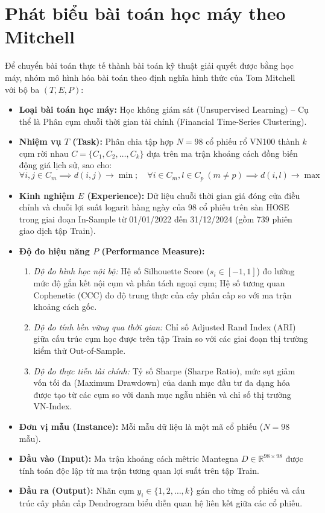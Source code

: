 \documentclass[12pt,a4paper,oneside,openany]{report}
\begin{document}
\section{Phát biểu bài toán học máy theo Mitchell}
Để chuyển bài toán thực tế thành bài toán kỹ thuật giải quyết được bằng học máy, nhóm mô hình hóa bài toán theo định nghĩa hình thức của Tom Mitchell \cite{mitchell1997} với bộ ba $(T, E, P)$:
\begin{itemize}
  \item \textbf{Loại bài toán học máy:} Học không giám sát (Unsupervised Learning) -- Cụ thể là Phân cụm chuỗi thời gian tài chính (Financial Time-Series Clustering).
  \item \textbf{Nhiệm vụ $T$ (Task):} Phân chia tập hợp $N = 98$ cổ phiếu rổ VN100 thành $k$ cụm rời nhau $C = \{C_1, C_2, \dots, C_k\}$ dựa trên ma trận khoảng cách đồng biến động giá lịch sử, sao cho:
  \begin{equation}
    \forall i, j \in C_m \implies d(i, j) \to \min; \quad \forall i \in C_m, l \in C_p \ (m \ne p) \implies d(i, l) \to \max
  \end{equation}
  \item \textbf{Kinh nghiệm $E$ (Experience):} Dữ liệu chuỗi thời gian giá đóng cửa điều chỉnh và chuỗi lợi suất logarit hàng ngày của 98 cổ phiếu trên sàn HOSE trong giai đoạn In-Sample từ 01/01/2022 đến 31/12/2024 (gồm 739 phiên giao dịch tập Train).
  \item \textbf{Độ đo hiệu năng $P$ (Performance Measure):}
  \begin{enumerate}
    \item \textit{Độ đo hình học nội bộ:} Hệ số Silhouette Score ($s_i \in [-1, 1]$) đo lường mức độ gắn kết nội cụm và phân tách ngoại cụm; Hệ số tương quan Cophenetic (CCC) đo độ trung thực của cây phân cấp so với ma trận khoảng cách gốc.
    \item \textit{Độ đo tính bền vững qua thời gian:} Chỉ số Adjusted Rand Index (ARI) giữa cấu trúc cụm học được trên tập Train so với các giai đoạn thị trường kiểm thử Out-of-Sample.
    \item \textit{Độ đo thực tiễn tài chính:} Tỷ số Sharpe (Sharpe Ratio), mức sụt giảm vốn tối đa (Maximum Drawdown) của danh mục đầu tư đa dạng hóa được tạo từ các cụm so với danh mục ngẫu nhiên và chỉ số thị trường VN-Index.
  \end{enumerate}
  \item \textbf{Đơn vị mẫu (Instance):} Mỗi mẫu dữ liệu là một mã cổ phiếu ($N = 98$ mẫu).
  \item \textbf{Đầu vào (Input):} Ma trận khoảng cách mêtric Mantegna $D \in \mathbb{R}^{98 \times 98}$ được tính toán độc lập từ ma trận tương quan lợi suất trên tập Train.
  \item \textbf{Đầu ra (Output):} Nhãn cụm $y_i \in \{1, 2, \dots, k\}$ gán cho từng cổ phiếu và cấu trúc cây phân cấp Dendrogram biểu diễn quan hệ liên kết giữa các cổ phiếu.
\end{itemize}
\end{document}
